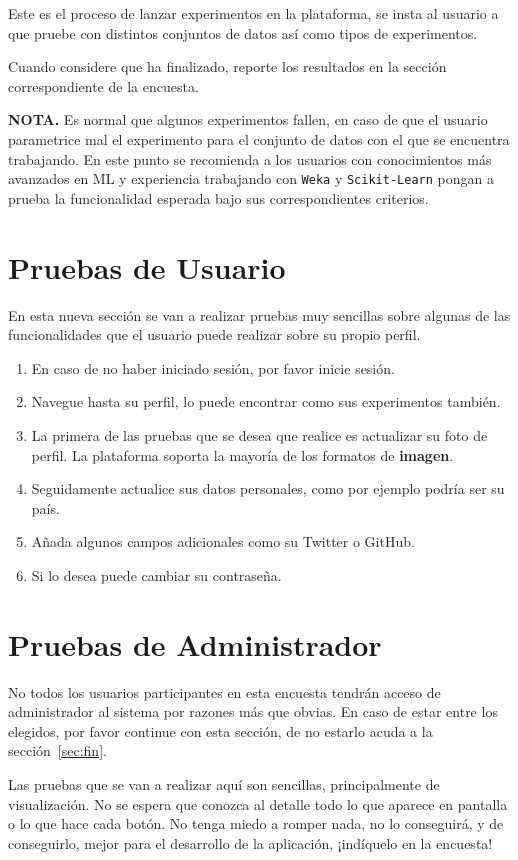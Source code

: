 \documentclass[
	12pt,
	spanish
]{article}
\begin{document}
Este es el proceso de lanzar experimentos en la plataforma, se insta al usuario a que pruebe con distintos conjuntos de datos así como tipos de experimentos. 

Cuando considere que ha finalizado, reporte los resultados en la sección correspondiente de la encuesta.
\vfill


\textbf{NOTA.} Es normal que algunos experimentos fallen, en caso de que el usuario parametrice mal el experimento para el conjunto de datos con el que se encuentra trabajando. En este punto se recomienda a los usuarios con conocimientos más avanzados en ML y experiencia trabajando con \texttt{Weka} y \texttt{Scikit-Learn} pongan a prueba la funcionalidad esperada bajo sus correspondientes criterios.
\pagebreak

\section{Pruebas de Usuario}
En esta nueva sección se van a realizar pruebas muy sencillas sobre algunas de las funcionalidades que el usuario puede realizar sobre su propio perfil.

\begin{enumerate}
\item En caso de no haber iniciado sesión, por favor inicie sesión.
\item Navegue hasta su perfil, lo puede encontrar como sus experimentos también.
\item La primera de las pruebas que se desea que realice es actualizar su foto de perfil. La plataforma soporta la mayoría de los formatos de \textbf{imagen}.
\item Seguidamente actualice sus datos personales, como por ejemplo podría ser su país.
\item Añada algunos campos adicionales como su Twitter o GitHub.
\item Si lo desea puede cambiar su contraseña.
\end{enumerate} 

\pagebreak
\section{Pruebas de Administrador}
No todos los usuarios participantes en esta encuesta tendrán acceso de administrador al sistema por razones más que obvias. En caso de estar entre los elegidos, por favor continue con esta sección, de no estarlo acuda a la sección~\ref{sec:fin}.

Las pruebas que se van a realizar aquí son sencillas, principalmente de visualización. No se espera que conozca al detalle todo lo que aparece en pantalla o lo que hace cada botón. No tenga miedo a romper nada, no lo conseguirá, y de conseguirlo, mejor para el desarrollo de la aplicación, ¡indíquelo en la encuesta!
\end{document}
